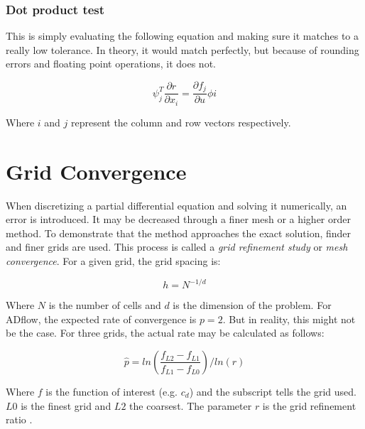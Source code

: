 \subsubsection{Dot product test}
This is simply evaluating the following equation and making sure it matches to
a really low tolerance. In theory, it would match perfectly, but because of
rounding errors and floating point operations, it does not.

\begin{equation}
    \psi_j^T \frac{\partial r}{\partial x_i} = 
    \frac{\partial f_j}{\partial u} \phi i
\end{equation}

\noindent Where $i$ and $j$ represent the column and row vectors respectively.




\section{Grid Convergence}
When discretizing a partial differential equation and solving it numerically,
an error is introduced. It may be decreased through a finer mesh or a higher
order method. To demonstrate that the method approaches the exact solution,
finder and finer grids are used. This process is called a \textit{grid
refinement study} or \textit{mesh convergence}. For a given grid, the grid
spacing is:

\begin{equation}
  h = N^{-1/d}
\end{equation}

\noindent Where $N$ is the number of cells and $d$ is the dimension of the
problem.
For ADflow, the expected rate of convergence is $p=2$. But in reality, this
might not be the case. For three grids, the actual rate may be calculated as
follows:

\begin{equation}
  \hat p = ln(\frac{f_{L2} - f_{L1}}{f_{L1} - f_{L0}}) / ln(r)
  \label{eq:conv_rate}
\end{equation}

\noindent Where $f$ is the function of interest (e.g. $c_{d}$) and the subscript
tells the grid used. $L0$ is the finest grid and $L2$ the coarsest. The
parameter $r$ is the grid refinement ratio .\cite{grid_refinement}
